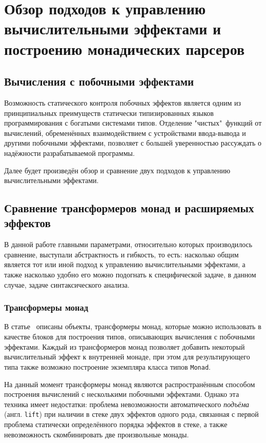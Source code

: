 \chapter{Обзор подходов к управлению вычислительными эффектами и построению
монадических парсеров}

\section{Вычисления с побочными эффектами}

  Возможность статического контроля побочных эффектов является одним из принципиальных 
  преимуществ статически типизированных языков программирования с богатыми системами типов. 
  Отделение "чистых"~функций от вычислений, обременённых взаимодействием с 
  устройствами ввода-вывода и другими побочными эффектами, позволяет с большей
  уверенностью рассуждать о надёжности разрабатываемой программы. 

  Далее будет произведён обзор и сравнение двух подходов к управлению вычислительными 
  эффектами.   

\section{Сравнение трансформеров монад и расширяемых эффектов}

  В данной работе главными параметрами, относительно которых производилось сравнение, 
  выступали абстрактность и гибкость, то есть: насколько общим является тот или иной подход к управлению вычислительными эффектами, а также насколько удобно его можно подогнать к 
  специфической задаче, в данном случае, задаче синтаксического анализа.  

  \subsection{Трансформеры монад}

    В статье~\cite{monadTransformers} описаны объекты, трансформеры монад,
    которые можно использовать в качестве блоков для построения типов, описывающих
    вычисления с побочными эффектами. Каждый из трансформеров монад позволяет
    добавить некоторый вычислительный эффект к внутренней монаде, при
    этом для результирующего типа также возможно построение экземпляра класса
    типов \lstinline{Monad}.

    На данный момент трансформеры монад являются распространённым способом
    построения вычислений с несколькими побочными эффектами. Однако эта
    техника имеет недостатки: проблема невозможности автоматического
    \emph{подъёма} (англ. \lstinline{lift}) при наличии в стеке двух эффектов одного
    рода, связанная с первой проблема статически определённого порядка эффектов в
    стеке, а также невозможность скомбинировать две произвольные монады.

